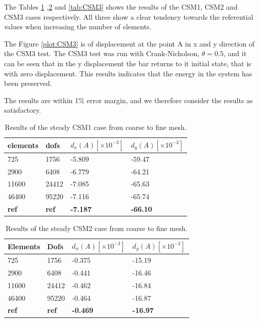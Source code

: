 The Tables \ref{tab:CSM1} ,\ref{tab:CSM2} and \ref{tab:CSM3} shows the results of the CSM1, CSM2 and CSM3 cases respectively. All three show a clear tendency towards the referential values when increasing the number of elements. 

The Figure \ref{plot:CSM3} is of displacement at the point A in x and y direction of the CSM3 test. The CSM3 test was run with Crank-Nicholson, $\theta = 0.5$, and it can be seen that in the y displacement the bar returns to it initial state, that is with zero displacement. This results indicates that the energy in the system has been preserved.

The results are within 1\% error margin, and we therefore consider the results as satisfactory.

\begin{table}[H]
\centering
\caption{Results of the steady CSM1 case from coarse to fine mesh.}
\label{tab:CSM1}
\begin{tabular}{|l|l|l|l|}
\hline
elements & dofs & $d_x(A) [\times10^{-3}]$ & $d_y(A) [\times10^{-3}]$ \\ \hline
725 & 1756 & -5.809 & -59.47 \\ \hline
2900 & 6408 & -6.779 & -64.21 \\ \hline
11600 & 24412 & -7.085 & -65.63 \\ \hline
46400 & 95220 & -7.116 & -65.74 \\ \hline
\textbf{ref} & \textbf{ref} & \textbf{-7.187} &  \textbf{-66.10} \\ \hline
\end{tabular}
\end{table}

\begin{table}[H]
\centering
\caption{Results of the steady CSM2 case from coarse to fine mesh.}
\label{tab:CSM2}
\begin{tabular}{@{}|l|l|l|l|@{}}
\hline
Elements & Dofs & $d_x(A) [\times10^{-3}] $& $d_y(A) [\times10^{-3}] $\\ \hline
725 &  1756 & -0.375 & -15.19 \\ \hline
2900 & 6408 & -0.441 & -16.46\\ \hline
11600 & 24412 & -0.462 & -16.84 \\ \hline
46400 & 95220 & -0.464 & -16.87\\ \hline
\textbf{ref} & \textbf{ref} &  \textbf{-0.469} &  \textbf{-16.97} \\ \hline
\end{tabular}
\end{table}

